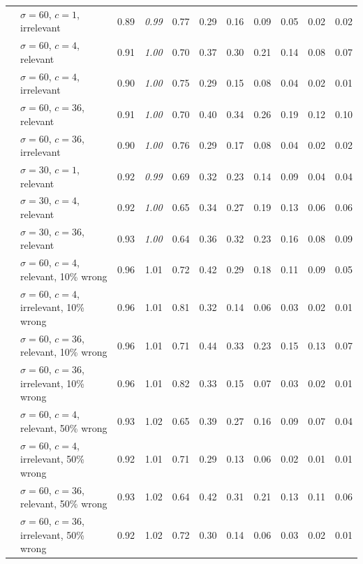 \begin{tabular}{llrrrrrrrrr}
 & $\sigma = 60$, $c = 1$, irrelevant & 0.89 & \textit{0.99} & 0.77 & 0.29 & 0.16 & 0.09 & 0.05 & 0.02 & 0.02 \\
 & $\sigma = 60$, $c = 4$, relevant & 0.91 & \textit{1.00} & 0.70 & 0.37 & 0.30 & 0.21 & 0.14 & 0.08 & 0.07 \\
 & $\sigma = 60$, $c = 4$, irrelevant & 0.90 & \textit{1.00} & 0.75 & 0.29 & 0.15 & 0.08 & 0.04 & 0.02 & 0.01 \\
 & $\sigma = 60$, $c = 36$, relevant & 0.91 & \textit{1.00} & 0.70 & 0.40 & 0.34 & 0.26 & 0.19 & 0.12 & 0.10 \\
 & $\sigma = 60$, $c = 36$, irrelevant & 0.90 & \textit{1.00} & 0.76 & 0.29 & 0.17 & 0.08 & 0.04 & 0.02 & 0.02 \\
 & $\sigma = 30$, $c = 1$, relevant & 0.92 & \textit{0.99} & 0.69 & 0.32 & 0.23 & 0.14 & 0.09 & 0.04 & 0.04 \\
 & $\sigma = 30$, $c = 4$, relevant & 0.92 & \textit{1.00} & 0.65 & 0.34 & 0.27 & 0.19 & 0.13 & 0.06 & 0.06 \\
 & $\sigma = 30$, $c = 36$, relevant & 0.93 & \textit{1.00} & 0.64 & 0.36 & 0.32 & 0.23 & 0.16 & 0.08 & 0.09 \\
 & $\sigma = 60$, $c = 4$, relevant, 10\% wrong & 0.96 & 1.01 & 0.72 & 0.42 & 0.29 & 0.18 & 0.11 & 0.09 & 0.05 \\
 & $\sigma = 60$, $c = 4$, irrelevant, 10\% wrong & 0.96 & 1.01 & 0.81 & 0.32 & 0.14 & 0.06 & 0.03 & 0.02 & 0.01 \\
 & $\sigma = 60$, $c = 36$, relevant, 10\% wrong & 0.96 & 1.01 & 0.71 & 0.44 & 0.33 & 0.23 & 0.15 & 0.13 & 0.07 \\
 & $\sigma = 60$, $c = 36$, irrelevant, 10\% wrong & 0.96 & 1.01 & 0.82 & 0.33 & 0.15 & 0.07 & 0.03 & 0.02 & 0.01 \\
 & $\sigma = 60$, $c = 4$, relevant, 50\% wrong & 0.93 & 1.02 & 0.65 & 0.39 & 0.27 & 0.16 & 0.09 & 0.07 & 0.04 \\
 & $\sigma = 60$, $c = 4$, irrelevant, 50\% wrong & 0.92 & 1.01 & 0.71 & 0.29 & 0.13 & 0.06 & 0.02 & 0.01 & 0.01 \\
 & $\sigma = 60$, $c = 36$, relevant, 50\% wrong & 0.93 & 1.02 & 0.64 & 0.42 & 0.31 & 0.21 & 0.13 & 0.11 & 0.06 \\
 & $\sigma = 60$, $c = 36$, irrelevant, 50\% wrong & 0.92 & 1.02 & 0.72 & 0.30 & 0.14 & 0.06 & 0.03 & 0.02 & 0.01 \\
\bottomrule
\end{tabular}
